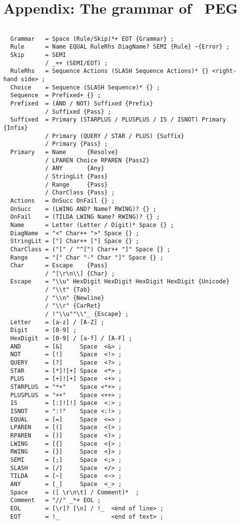 \newpage

\section{Appendix: The grammar of \Mouse\ PEG}


\small 
\begin{Verbatim}[frame=single,framesep=2mm,samepage=true,xleftmargin=10mm,xrightmargin=10mm,baselinestretch=0.8]

  Grammar   = Space (Rule/Skip)*+ EOT {Grammar} ;
  Rule      = Name EQUAL RuleRhs DiagName? SEMI {Rule} ~{Error} ;
  Skip      = SEMI             
            / _++ (SEMI/EOT) ; 
  RuleRhs   = Sequence Actions (SLASH Sequence Actions)* {} <right-hand side> ;
  Choice    = Sequence (SLASH Sequence)* {} ;
  Sequence  = Prefixed+ {} ;
  Prefixed  = (AND / NOT) Suffixed {Prefix}
            / Suffixed {Pass} ;
  Suffixed  = Primary (STARPLUS / PLUSPLUS / IS / ISNOT) Primary {Infix}
            / Primary (QUERY / STAR / PLUS) {Suffix}
            / Primary {Pass} ;
  Primary   = Name      {Resolve}
            / LPAREN Choice RPAREN {Pass2}
            / ANY       {Any}
            / StringLit {Pass}
            / Range     {Pass}
            / CharClass {Pass} ;
  Actions   = OnSucc OnFail {} ;
  OnSucc    = (LWING AND? Name? RWING)? {} ;
  OnFail    = (TILDA LWING Name? RWING)? {} ;
  Name      = Letter (Letter / Digit)* Space {} ;
  DiagName  = "<" Char++ ">" Space {} ;
  StringLit = ["] Char++ ["] Space {} ;
  CharClass = ("[" / "^[") Char++ "]" Space {} ;
  Range     = "[" Char "-" Char "]" Space {} ;
  Char      = Escape    {Pass}
            / ^[\r\n\\] {Char} ;
  Escape    = "\\u" HexDigit HexDigit HexDigit HexDigit {Unicode}
            / "\\t" {Tab}
            / "\\n" {Newline}
            / "\\r" {CarRet}
            / !"\\u""\\"_ {Escape} ;
  Letter    = [a-z] / [A-Z] ;
  Digit     = [0-9] ;
  HexDigit  = [0-9] / [a-f] / [A-F] ;
  AND       = [&]     Space  <&> ;
  NOT       = [!]     Space  <!> ;
  QUERY     = [?]     Space  <?> ;
  STAR      = [*]![+] Space  <*> ;
  PLUS      = [+]![+] Space  <+> ;
  STARPLUS  = "*+"    Space <*+> ;
  PLUSPLUS  = "++"    Space <++> ;
  IS        = [:]![!] Space  <:> ;
  ISNOT     = ":!"    Space <:!> ;
  EQUAL     = [=]     Space  <=> ;
  LPAREN    = [(]     Space  <(> ;
  RPAREN    = [)]     Space  <)> ;
  LWING     = [{]     Space  <{> ;
  RWING     = [}]     Space  <}> ;
  SEMI      = [;]     Space  <;> ;
  SLASH     = [/]     Space  </> ;
  TILDA     = [~]     Space  <~> ;
  ANY       = [_]     Space  <_> ;
  Space     = ([ \r\n\t] / Comment)*  ;
  Comment   = "//" _*+ EOL ;
  EOL       = [\r]? [\n] / !_  <end of line> ;
  EOT       = !_               <end of text> ;

\end{Verbatim}
\normalsize
